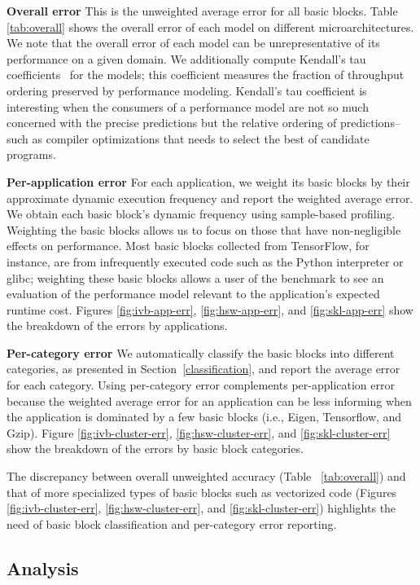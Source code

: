 \textbf{Overall error} This is the unweighted average error for all basic blocks.
Table \ref{tab:overall} shows the overall error of each model on different microarchitectures.
We note that the overall error of each model can be unrepresentative
of its performance on a given domain.
We additionally compute Kendall's tau coefficients~\cite{kendalltau} for the models;
this coefficient measures the fraction of throughput ordering
preserved by performance modeling.
Kendall's tau coefficient is interesting when the consumers of a performance model
are not so much concerned with the precise predictions but
the relative ordering of predictions--such as compiler optimizations that needs 
to select the best of candidate programs.

\textbf{Per-application error}
For each application, we weight its basic blocks by their approximate
dynamic execution frequency
and report the weighted average error.
We obtain each basic block's dynamic frequency using sample-based profiling.
Weighting the basic blocks allows us to focus on those that have
non-negligible effects on performance.
Most basic blocks collected from TensorFlow\cite{tensorflow},
for instance, are from infrequently executed code 
such as the Python interpreter or glibc;
weighting these basic blocks allows a user of the benchmark
to see an evaluation  of the performance model relevant
to the application's expected runtime cost.
Figures \ref{fig:ivb-app-err}, \ref{fig:hsw-app-err}, and \ref{fig:skl-app-err}
show the breakdown of the errors by applications.

\textbf{Per-category error} 
We automatically classify the basic blocks into
different categories, as presented in Section~\ref{classification},
and report the average error for each category.
Using per-category error complements per-application error
because the weighted average error for an application can be less informing 
when the application is dominated by a few basic blocks
(i.e., Eigen, Tensorflow, and Gzip).
Figure \ref{fig:ivb-cluster-err}, \ref{fig:hsw-cluster-err}, 
and \ref{fig:skl-cluster-err} show the breakdown of the errors by basic block categories.

The discrepancy between overall unweighted accuracy (Table ~\ref{tab:overall})
and that of more specialized types of basic blocks
such as vectorized code (Figures \ref{fig:ivb-cluster-err},
\ref{fig:hsw-cluster-err},
and \ref{fig:skl-cluster-err}) highlights
the need of basic block classification and per-category error reporting.

\subsection{Analysis}
 
